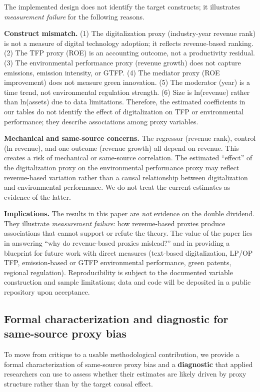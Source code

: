The implemented design does not identify the target constructs; it illustrates \emph{measurement failure} for the following reasons.

\textbf{Construct mismatch.} (1) The digitalization proxy (industry-year revenue rank) is not a measure of digital technology adoption; it reflects revenue-based ranking. (2) The TFP proxy (ROE) is an accounting outcome, not a productivity residual. (3) The environmental performance proxy (revenue growth) does not capture emissions, emission intensity, or GTFP. (4) The mediator proxy (ROE improvement) does not measure green innovation. (5) The moderator (year) is a time trend, not environmental regulation strength. (6) Size is ln(revenue) rather than ln(assets) due to data limitations. Therefore, the estimated coefficients in our tables do not identify the effect of digitalization on TFP or environmental performance; they describe associations among proxy variables.

\textbf{Mechanical and same-source concerns.} The regressor (revenue rank), control (ln revenue), and one outcome (revenue growth) all depend on revenue. This creates a risk of mechanical or same-source correlation. The estimated ``effect'' of the digitalization proxy on the environmental performance proxy may reflect revenue-based variation rather than a causal relationship between digitalization and environmental performance. We do not treat the current estimates as evidence of the latter.

\textbf{Implications.} The results in this paper are \emph{not} evidence on the double dividend. They illustrate \emph{measurement failure}: how revenue-based proxies produce associations that cannot support or refute the theory. The value of the paper lies in answering ``why do revenue-based proxies mislead?'' and in providing a blueprint for future work with direct measures (text-based digitalization, LP/OP TFP, emission-based or GTFP environmental performance, green patents, regional regulation). Reproducibility is subject to the documented variable construction and sample limitations; data and code will be deposited in a public repository upon acceptance.

\subsection{Formal characterization and diagnostic for same-source proxy bias}
\label{sec:formal-diagnostic}

To move from critique to a usable methodological contribution, we provide a formal characterization of same-source proxy bias and a \textbf{diagnostic} that applied researchers can use to assess whether their estimates are likely driven by proxy structure rather than by the target causal effect.

